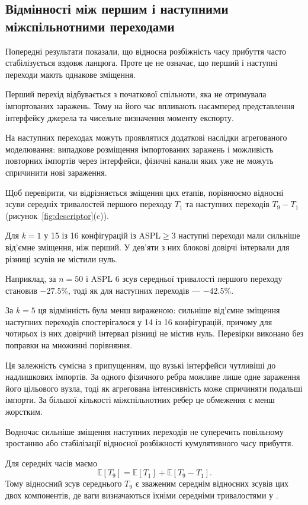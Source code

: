 \subsection{Відмінності між першим
і наступними міжспільнотними переходами}

Попередні результати показали,
що відносна розбіжність часу
прибуття часто стабілізується
вздовж ланцюга.
Проте це не означає,
що перший і наступні переходи
мають однакове зміщення.

Перший перехід відбувається
з початкової спільноти,
яка не отримувала імпортованих
заражень. Тому на його час
впливають насамперед
представлення інтерфейсу
джерела та чисельне
визначення моменту експорту.

На наступних переходах
можуть проявлятися
додаткові наслідки
агрегованого моделювання:
випадкове розміщення
імпортованих заражень
і можливість повторних
імпортів через інтерфейси,
фізичні канали яких
уже не можуть спричинити
нові зараження.

Щоб перевірити, чи відрізняється
зміщення цих етапів,
порівнюємо відносні зсуви
середніх тривалостей
першого переходу $T_1$
та наступних переходів
$T_9-T_1$
(рисунок~\ref{fig:descriptor}(c)).

Для $k=1$ у 15 із 16
конфігурацій із
$\mathrm{ASPL}\geq3$
наступні переходи мали
сильніше від'ємне зміщення,
ніж перший.
У дев'яти з них
блокові довірчі інтервали
для різниці зсувів
не містили нуль.

Наприклад, за $n=50$
і ASPL 6 зсув середньої
тривалості першого переходу
становив $-27.5\%$,
тоді як для наступних
переходів --- $-42.5\%$.

За $k=5$ ця відмінність
була менш вираженою:
сильніше від'ємне
зміщення наступних
переходів спостерігалося
у 14 із 16 конфігурацій,
причому для чотирьох
із них довірчий інтервал
різниці не містив нуль.
Перевірки виконано
без поправки на множинні
порівняння.

Ця залежність сумісна
з припущенням, що вузькі
інтерфейси чутливіші
до надлишкових імпортів.
За одного фізичного ребра
можливе лише одне
зараження його цільового
вузла, тоді як агрегована
інтенсивність може
спричиняти подальші імпорти.
За більшої кількості
міжспільнотних ребер
це обмеження є менш
жорстким.

Водночас сильніше зміщення
наступних переходів
не суперечить повільному
зростанню або стабілізації
відносної розбіжності
кумулятивного часу прибуття.

Для середніх часів маємо
\begin{equation}
\mathbb{E}[T_9]
=
\mathbb{E}[T_1]
+
\mathbb{E}[T_9-T_1].
\end{equation}
Тому відносний зсув
середнього $T_9$
є зваженим середнім
відносних зсувів
цих двох компонентів,
де ваги визначаються
їхніми середніми
тривалостями у \Full{}.

